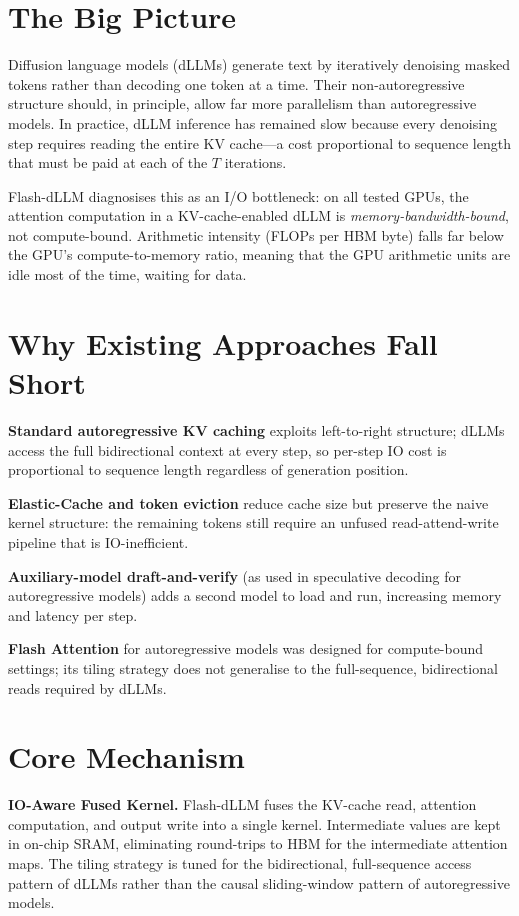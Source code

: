 \documentclass[10pt,twocolumn]{article}
\begin{document}
\section{The Big Picture}

Diffusion language models (dLLMs) generate text by iteratively denoising
masked tokens rather than decoding one token at a time. Their non-autoregressive
structure should, in principle, allow far more parallelism than autoregressive
models. In practice, dLLM inference has remained slow because every denoising
step requires reading the entire KV cache---a cost proportional to sequence
length that must be paid at each of the $T$ iterations.

Flash-dLLM diagnosises this as an I/O bottleneck: on all tested GPUs, the
attention computation in a KV-cache-enabled dLLM is \emph{memory-bandwidth-bound},
not compute-bound. Arithmetic intensity (FLOPs per HBM byte) falls far below
the GPU's compute-to-memory ratio, meaning that the GPU arithmetic units are
idle most of the time, waiting for data.

\section{Why Existing Approaches Fall Short}

\textbf{Standard autoregressive KV caching} exploits left-to-right structure;
dLLMs access the full bidirectional context at every step, so per-step IO cost
is proportional to sequence length regardless of generation position.

\textbf{Elastic-Cache and token eviction} reduce cache size but preserve the
naive kernel structure: the remaining tokens still require an unfused
read-attend-write pipeline that is IO-inefficient.

\textbf{Auxiliary-model draft-and-verify} (as used in speculative decoding for
autoregressive models) adds a second model to load and run, increasing memory
and latency per step.

\textbf{Flash Attention} for autoregressive models was designed for compute-bound
settings; its tiling strategy does not generalise to the full-sequence,
bidirectional reads required by dLLMs.

\section{Core Mechanism}

\textbf{IO-Aware Fused Kernel.} Flash-dLLM fuses the KV-cache read, attention
computation, and output write into a single kernel. Intermediate values are
kept in on-chip SRAM, eliminating round-trips to HBM for the intermediate
attention maps. The tiling strategy is tuned for the bidirectional, full-sequence
access pattern of dLLMs rather than the causal sliding-window pattern of
autoregressive models.
\end{document}
